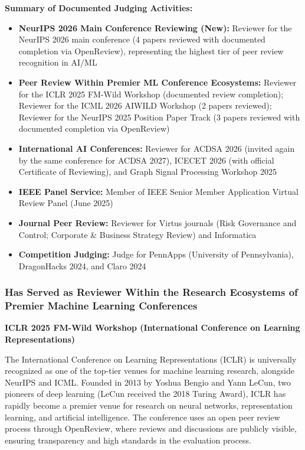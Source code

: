\textbf{Summary of Documented Judging Activities:}
\begin{itemize}
    \item \textbf{NeurIPS 2026 Main Conference Reviewing (New):} Reviewer for the NeurIPS 2026 main conference (4 papers reviewed with documented completion via OpenReview), representing the highest tier of peer review recognition in AI/ML
    \item \textbf{Peer Review Within Premier ML Conference Ecosystems:} Reviewer for the ICLR 2025 FM-Wild Workshop (documented review completion); Reviewer for the ICML 2026 AIWILD Workshop (2 papers reviewed); Reviewer for the NeurIPS 2025 Position Paper Track (3 papers reviewed with documented completion via OpenReview)
    \item \textbf{International AI Conferences:} Reviewer for ACDSA 2026 (invited again by the same conference for ACDSA 2027), ICECET 2026 (with official Certificate of Reviewing), and Graph Signal Processing Workshop 2025
    \item \textbf{IEEE Panel Service:} Member of IEEE Senior Member Application Virtual Review Panel (June 2025)
    \item \textbf{Journal Peer Review:} Reviewer for Virtus journals (Risk Governance and Control; Corporate \& Business Strategy Review) and Informatica
    \item \textbf{Competition Judging:} Judge for PennApps (University of Pennsylvania), DragonHacks 2024, and Claro 2024
\end{itemize}


\subsubsection{\dr Has Served as Reviewer Within the Research Ecosystems of Premier Machine Learning Conferences}
\label{judge:premier}

\textbf{ICLR 2025 FM-Wild Workshop (International Conference on Learning Representations)}

The International Conference on Learning Representations (ICLR) is universally recognized as one of the top-tier venues for machine learning research, alongside NeurIPS and ICML. Founded in 2013 by Yoshua Bengio and Yann LeCun, two pioneers of deep learning (LeCun received the 2018 Turing Award), ICLR has rapidly become a premier venue for research on neural networks, representation learning, and artificial intelligence. The conference uses an open peer review process through OpenReview, where reviews and discussions are publicly visible, ensuring transparency and high standards in the evaluation process.

